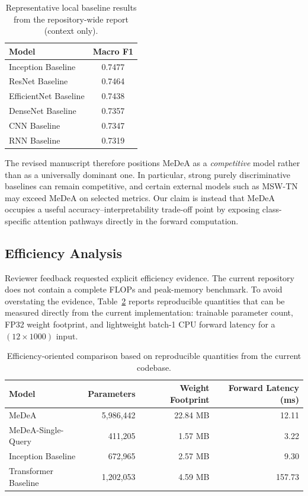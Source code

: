 \documentclass[11pt]{article}
\begin{document}
\begin{table}[htbp]
\centering
\caption{Representative local baseline results from the repository-wide report (context only).}
\label{tab:local-baselines}
\begin{tabular}{lc}
\toprule
Model & Macro F1 \\
\midrule
Inception Baseline & 0.7477 \\
ResNet Baseline & 0.7464 \\
EfficientNet Baseline & 0.7438 \\
DenseNet Baseline & 0.7357 \\
CNN Baseline & 0.7347 \\
RNN Baseline & 0.7319 \\
\bottomrule
\end{tabular}
\end{table}

The revised manuscript therefore positions MeDeA as a \emph{competitive} model rather than as a universally dominant one. In particular, strong purely discriminative baselines can remain competitive, and certain external models such as MSW-TN may exceed MeDeA on selected metrics. Our claim is instead that MeDeA occupies a useful accuracy--interpretability trade-off point by exposing class-specific attention pathways directly in the forward computation.

\subsection{Efficiency Analysis}

Reviewer feedback requested explicit efficiency evidence. The current repository does not contain a complete FLOPs and peak-memory benchmark. To avoid overstating the evidence, Table~\ref{tab:efficiency} reports reproducible quantities that can be measured directly from the current implementation: trainable parameter count, FP32 weight footprint, and lightweight batch-1 CPU forward latency for a $(12 \times 1000)$ input.

\begin{table}[htbp]
\centering
\caption{Efficiency-oriented comparison based on reproducible quantities from the current codebase.}
\label{tab:efficiency}
\begin{tabular}{lrrr}
\toprule
Model & Parameters & Weight Footprint & Forward Latency (ms) \\
\midrule
MeDeA & 5,986,442 & 22.84 MB & 12.11 \\
MeDeA-Single-Query & 411,205 & 1.57 MB & 3.22 \\
Inception Baseline & 672,965 & 2.57 MB & 9.30 \\
Transformer Baseline & 1,202,053 & 4.59 MB & 157.73 \\
\bottomrule
\end{tabular}
\end{table}
\end{document}
